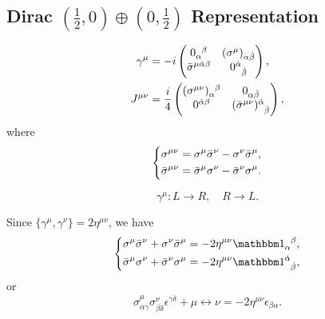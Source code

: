 \subsection{\texorpdfstring{Dirac $(\frac{1}{2}, 0) \oplus (0, \frac{1}{2})$ Representation}{Dirac (1/2,0) + (0,1/2) Representation}}
\begin{align}
    \gamma^\mu & = - i \begin{pmatrix}
        \tensor{0}{_\alpha^\beta} & (\sigma^\mu)_{\alpha \dot\beta} \\
        \bar\sigma^{\mu \dot\alpha \beta} & \tensor{0}{^{\dot\alpha}_{\dot\beta}}
    \end{pmatrix}, \\
    J^{\mu \nu} & = \frac{i}{4} \begin{pmatrix}
        \tensor{(\sigma^{\mu \nu})}{_\alpha^\beta} & 0_{\alpha \dot\beta} \\
        0^{\dot\alpha \beta} & \tensor{(\bar\sigma^{\mu \nu})}{^{\dot\alpha}_{\dot\beta}}
    \end{pmatrix},
\end{align}
where
\begin{equation}
    \begin{dcases}
        \sigma^{\mu \nu} = \sigma^\mu \bar\sigma^\nu - \sigma^\nu \bar\sigma^\mu, \\
        \bar\sigma^{\mu \nu} = \bar\sigma^\mu \sigma^\nu - \bar\sigma^\nu \sigma^\mu.
    \end{dcases}
\end{equation}
\begin{framed}
    \begin{equation}
        \gamma^\mu: L \to R, \quad R \to L.
    \end{equation}
\end{framed}

Since $\{\gamma^\mu, \gamma^\nu\} = 2 \eta^{\mu \nu}$, we have
\begin{equation}
    \begin{dcases}
        \sigma^\mu \bar\sigma^\nu + \sigma^\nu \bar\sigma^\mu = - 2 \eta^{\mu \nu} \tensor{\id}{_\alpha^\beta}, \\
        \bar\sigma^\mu \sigma^\nu + \bar\sigma^\nu \sigma^\mu = - 2 \eta^{\mu \nu} \tensor{\id}{^{\dot\alpha}_{\dot\beta}},
    \end{dcases}
\end{equation}
or
\begin{equation}
    \sigma^\mu_{\alpha \dot\gamma} \sigma^\nu_{\beta \dot\delta} \epsilon^{\dot\gamma \dot\delta} + \mu \leftrightarrow \nu = - 2 \eta^{\mu \nu} \epsilon_{\beta \alpha}.
\end{equation}
